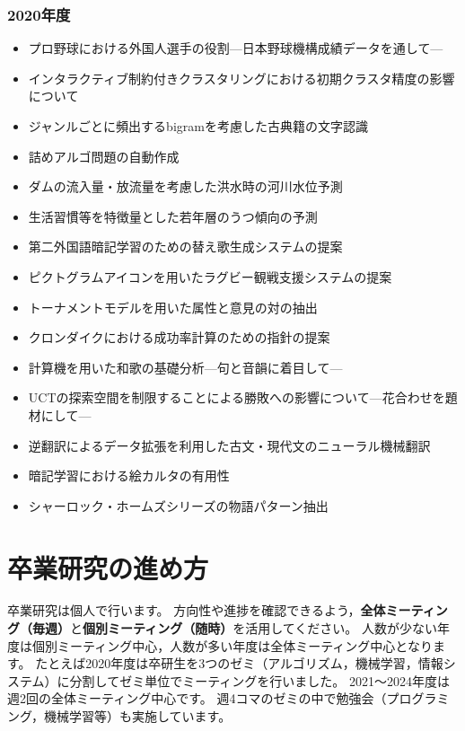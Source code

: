 \documentclass[paper=a4paper,fontsize=10.4pt]{jlreq}
\renewcommand{\emph}[1]{\textbf{#1}}
\begin{document}
\begin{tcolorbox}
\begin{multicols}{2}
\subsubsection*{2020年度}
\begin{itemize}[leftmargin=3mm]
  \item プロ野球における外国人選手の役割---日本野球機構成績データを通して---
  \item インタラクティブ制約付きクラスタリングにおける初期クラスタ精度の影響について
  \item ジャンルごとに頻出するbigramを考慮した古典籍の文字認識
  \item 詰めアルゴ問題の自動作成
  \item ダムの流入量・放流量を考慮した洪水時の河川水位予測
  \item 生活習慣等を特徴量とした若年層のうつ傾向の予測
  \item 第二外国語暗記学習のための替え歌生成システムの提案
  \item ピクトグラムアイコンを用いたラグビー観戦支援システムの提案
  \item トーナメントモデルを用いた属性と意見の対の抽出
  \item クロンダイクにおける成功率計算のための指針の提案
  \item 計算機を用いた和歌の基礎分析---句と音韻に着目して---
  \item UCTの探索空間を制限することによる勝敗への影響について---花合わせを題材にして---
  \item 逆翻訳によるデータ拡張を利用した古文・現代文のニューラル機械翻訳
  \item 暗記学習における絵カルタの有用性
  \item シャーロック・ホームズシリーズの物語パターン抽出
\end{itemize}
\end{multicols}
\end{tcolorbox}

\clearpage
\section{卒業研究の進め方}

卒業研究は個人で行います。
方向性や進捗を確認できるよう，\emph{全体ミーティング（毎週）}と\emph{個別ミーティング（随時）}を活用してください。
人数が少ない年度は個別ミーティング中心，人数が多い年度は全体ミーティング中心となります。
たとえば2020年度は卒研生を3つのゼミ（アルゴリズム，機械学習，情報システム）に分割してゼミ単位でミーティングを行いました。
2021～2024年度は週2回の全体ミーティング中心です。
週4コマのゼミの中で勉強会（プログラミング，機械学習等）も実施しています。
\end{document}
